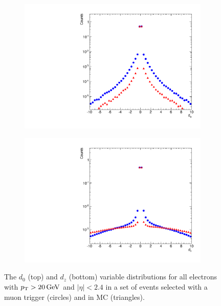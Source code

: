 \begin{figure}[!htbp]
    \centering
    \begin{subfigure}[b]{0.65\textwidth}
        \includegraphics[width=\textwidth]{figures/d0.pdf}
        \caption{}
        \label{fig:d0}
    \end{subfigure}
    \begin{subfigure}[b]{0.65\textwidth}
        \includegraphics[width=\textwidth]{figures/dz.pdf}
        \caption{}
        \label{fig:dz}
    \end{subfigure}
    \caption[
        Distributions of $d_{0}$ and $d_{z}$ in data and MC.
    ]{
        The $d_{0}$ (top) and $d_{z}$ (bottom) variable distributions for all
        electrons with $p_{\mathrm{T}} > 20 \,\text{Ge\hspace{-.08em}V}$ and $|\eta| < 2.4$ in a set of events
        selected with a muon trigger (circles) and in \MADGRAPH \Ztoee MC
        (triangles).
    }
    \label{fig:d0_dz}
\end{figure}
